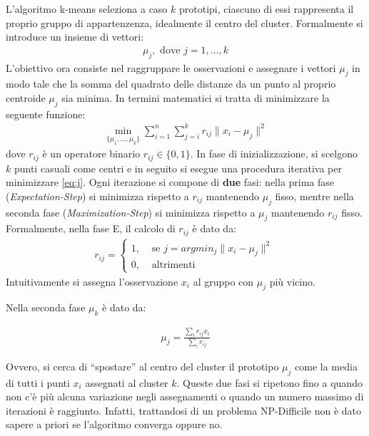 L'algoritmo k-means seleziona a caso $k$ prototipi, ciascuno di essi rappresenta il proprio gruppo di appartenzenza, idealmente il centro del cluster. Formalmente si introduce un insieme di vettori:
\begin{align*}
	\mu_j, \text{ dove } j = 1, \dots, k
\end{align*}
L'obiettivo ora consiste nel raggruppare le osservazioni e assegnare i vettori $\mu_j$ in modo tale che la somma del quadrato delle distanze da un punto al proprio centroide $\mu_j$ sia minima. In termini matematici si tratta di minimizzare la seguente funzione:
\begin{align}
	\min_{\{\mu_1, \dots, \mu_k\}} \sum_{i=1}^n \sum_{j=i}^k r_{ij} \| x_i - \mu_j \|^2\label{eq:j}
\end{align}
dove $r_{ij}$ è un operatore binario $r_{ij} \in \{ 0, 1 \}$. In fase di inizializzazione, si scelgono $k$ punti casuali come centri e in seguito si esegue una procedura iterativa per minimizzare \eqref{eq:j}. Ogni iterazione si compone di \textbf{due} fasi: nella prima fase (\emph{Expectation-Step}) si minimizza rispetto a $r_{ij}$ mantenendo $\mu_j$ fisso, mentre nella seconda fase (\emph{Maximization-Step}) si minimizza rispetto a $\mu_j$ mantenendo $r_{ij}$ fisso. Formalmente, nella fase E, il calcolo di $r_{ij}$ è dato da:
\begin{align*}
	r_{ij} =
	\begin{cases}
		1, &\text{ se }j = argmin_j \| x_i - \mu_j \|^2 \\
		0, &\text{ altrimenti}
	\end{cases}
\end{align*}
Intuitivamente si assegna l’osservazione $x_i$ al gruppo con $\mu_j$ più vicino.

\newpage

Nella seconda fase $\mu_k$ è dato da:

\begin{align*}
	\mu_j = \frac{\displaystyle\sum_i r_{ij} x_i}{\displaystyle\sum_i r_{ij}}
\end{align*}

Ovvero, si cerca di “spostare” al centro del cluster il prototipo $\mu_j$ come la media di tutti i punti $x_i$ assegnati al cluster $k$. Queste due fasi si ripetono fino a quando non c'è più alcuna variazione negli assegnamenti o quando un numero massimo di iterazioni è raggiunto. Infatti, trattandosi di un problema NP-Difficile non è dato sapere a priori se l'algoritmo converga oppure no.

